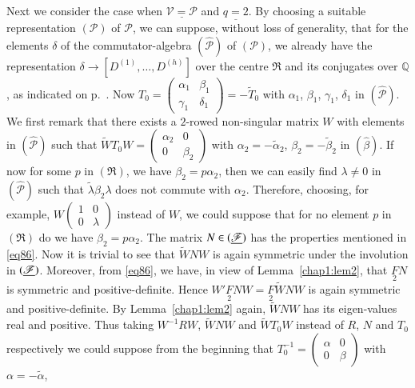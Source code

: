 Next we consider the case when $\underline{\mathscr{V}=\mathscr{P}}$
and $\underline{q=2}$. By choosing a suitable representation
$(\mathscr{P})$ of $\mathscr{P}$, we can suppose, without loss of
generality, that for the elements $\delta$ of the commutator-algebra
$(\widehat{\mathscr{P}})$ of $(\mathscr{P})$, we already have the
representation $\delta\to [D^{(1)},\ldots,D^{(h)}]$ over the centre
$\mathfrak{R}$ and its conjugates over $\mathbb{Q}$, as indicated on
p.~\pageref{p63}. Now $T_{0}=\left(\begin{smallmatrix} \alpha_{1} &
  \beta_{1}\\ \gamma_{1} & \delta_{1}
\end{smallmatrix}\right)=-\widetilde{T}_{0}$ with $\alpha_{1}$,
$\beta_{1}$, $\gamma_{1}$, $\delta_{1}$ in
$(\widehat{\mathscr{P}})$. We first remark that there exists a
$2$-rowed non-singular matrix $W$ with elements in
$(\widehat{\mathscr{P}})$ such that
$\widetilde{W}T_{0}W=\left(\begin{smallmatrix} \alpha_{2} & 0\\ 0 &
  \beta_{2}\end{smallmatrix}\right)$ with
$\alpha_{2}=-\widetilde{\alpha}_{2}$,
$\beta_{2}=-\widetilde{\beta}_{2}$ in $(\widehat{\beta})$. If now for
some $p$ in $(\mathfrak{R})$, we have $\beta_{2}=p\alpha_{2}$, then we
can easily find $\lambda\neq 0$ in $(\widehat{\mathscr{P}})$ such that
$\widetilde{\lambda}\beta_{2}\lambda$ does not commute with
$\alpha_{2}$. Therefore, choosing, for example,
$W\left(\begin{smallmatrix} 1 & 0\\ 0 & \lambda
\end{smallmatrix}\right)$ instead of $W$, we could suppose that for no
element $p$ in $(\mathfrak{R})$ do we have
$\beta_{2}=p\alpha_{2}$. The matrix $N\in(\underline{\mathscr{F}})$ has the
properties mentioned in \eqref{eq86}. Now it is trivial to see that
$\widetilde{W}NW$ is again symmetric under the\pageoriginale
involution in $(\underline{\mathscr{F}})$. Moreover, from \eqref{eq86}, we
have, in view of Lemma~\ref{chap1:lem2}, that $\underset{2}{F}N$ is
symmetric and positive-definite. Hence
$W'\underset{2}FNW=\underset{2}{F}\widetilde{W}NW$ is again symmetric
and positive-definite. By Lemma~\ref{chap1:lem2} again, $\widetilde{W}NW$
has its eigen-values real and positive. Thus taking $W^{-1}RW$,
$\widetilde{W}NW$ and $\widetilde{W}T_{0}W$ instead of $R$, $N$ and
$T_{0}$ respectively we could suppose from the beginning that
$T^{-1}_{0}=\left(\begin{smallmatrix} \alpha & 0\\ 0 & \beta
\end{smallmatrix}\right)$ with $\alpha=-\widetilde{\alpha}$,
